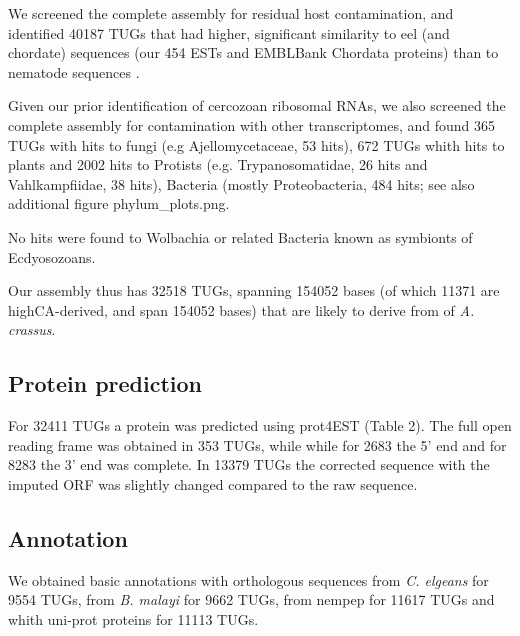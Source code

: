\documentclass[10pt]{bmc_article}
\newenvironment{bmcformat}{\begin{raggedright}\baselineskip20pt\sloppy\setboolean{publ}{false}}{\end{raggedright}\baselineskip20pt\sloppy}
\begin{document}
\begin{bmcformat}
We screened the complete assembly for residual host contamination, and
identified
40187
  TUGs that had higher, significant similarity to eel (and chordate)
  sequences (our 454 ESTs and EMBLBank Chordata proteins) than to
  nematode sequences \cite{pmid21550347}.

  Given our prior identification of cercozoan ribosomal RNAs, we also
  screened the complete assembly for contamination with other
  transcriptomes, and found 365 TUGs with hits
  to fungi (e.g Ajellomycetaceae, 53 hits),
  672 TUGs whith hits to plants and
  2002 hits to Protists (e.g. Trypanosomatidae,
  26 hits and Vahlkampfiidae, 38 hits), Bacteria (mostly
  Proteobacteria, 484 hits; see also additional figure
  phylum\_plots.png.

  No hits were found to Wolbachia or related Bacteria known as
  symbionts of Ecdyosozoans.

  Our assembly thus has 32518 TUGs,
  spanning 154052 bases
  (of which 11371 are
  highCA-derived, and span
  154052 bases) that are
  likely to derive from of \textit{A. crassus}.

\subsection*{Protein prediction}
















For
32411
TUGs a protein was predicted using prot4EST
\cite{wasmuth_prot4est:_2004} (Table 2). The full open reading frame
was obtained in
353 TUGs, while
while for 2683 the
5’ end and for 8283
the 3' end was complete. In 13379 TUGs the
corrected sequence with the imputed ORF was slightly changed compared
to the raw sequence.

\subsection*{Annotation}

We obtained basic annotations with orthologous sequences from
\textit{C. elgeans} for
9554 TUGs,
from \textit{B. malayi} for
9662 TUGs,
from nempep \cite{parkinson_nembase:resource_2004, pmid21550347} for
11617
TUGs and whith uni-prot proteins for
11113 TUGs.


\end{bmcformat}
\end{document}
